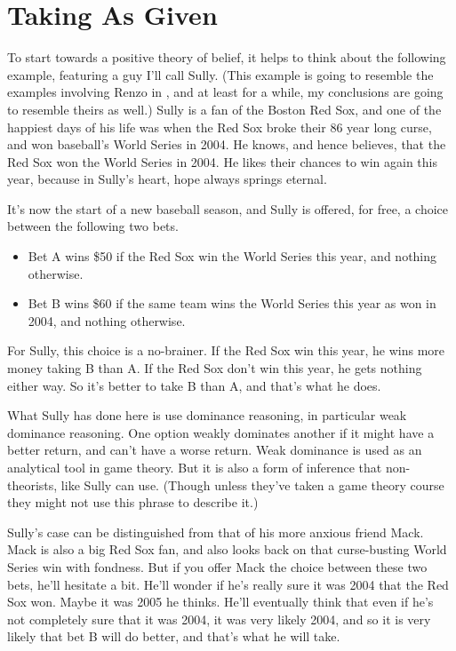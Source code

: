\documentclass[
  11pt,
]{book}
\providecommand{\tightlist}{%
  \setlength{\itemsep}{0pt}\setlength{\parskip}{0pt}}
\begin{document}
\hypertarget{given}{%
\section{Taking As Given}\label{given}}

To start towards a positive theory of belief, it helps to think about the following example, featuring a guy I'll call Sully. (This example is going to resemble the examples involving Renzo in \citet{RossSchroeder2014}, and at least for a while, my conclusions are going to resemble theirs as well.) Sully is a fan of the Boston Red Sox, and one of the happiest days of his life was when the Red Sox broke their 86 year long curse, and won baseball's World Series in 2004. He knows, and hence believes, that the Red Sox won the World Series in 2004. He likes their chances to win again this year, because in Sully's heart, hope always springs eternal.

It's now the start of a new baseball season, and Sully is offered, for free, a choice between the following two bets.

\begin{itemize}
\tightlist
\item
  Bet A wins \$50 if the Red Sox win the World Series this year, and nothing otherwise.
\item
  Bet B wins \$60 if the same team wins the World Series this year as won in 2004, and nothing otherwise.
\end{itemize}

For Sully, this choice is a no-brainer. If the Red Sox win this year, he wins more money taking B than A. If the Red Sox don't win this year, he gets nothing either way. So it's better to take B than A, and that's what he does.

What Sully has done here is use dominance reasoning, in particular weak dominance reasoning. One option weakly dominates another if it might have a better return, and can't have a worse return. Weak dominance is used as an analytical tool in game theory. But it is also a form of inference that non-theorists, like Sully can use. (Though unless they've taken a game theory course they might not use this phrase to describe it.)

Sully's case can be distinguished from that of his more anxious friend Mack. Mack is also a big Red Sox fan, and also looks back on that curse-busting World Series win with fondness. But if you offer Mack the choice between these two bets, he'll hesitate a bit. He'll wonder if he's really sure it was 2004 that the Red Sox won. Maybe it was 2005 he thinks. He'll eventually think that even if he's not completely sure that it was 2004, it was very likely 2004, and so it is very likely that bet B will do better, and that's what he will take.
\end{document}
